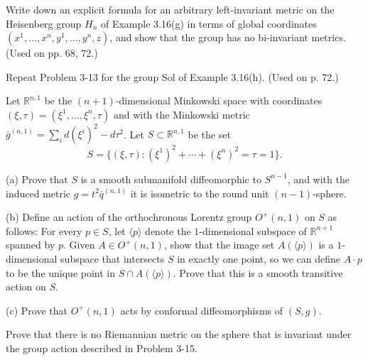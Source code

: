 \begin{exercise}
\label{prob:heisenberg-group-metrics}
Write down an explicit formula for an arbitrary left-invariant metric on the Heisenberg group $H_n$ of Example 3.16(g) in terms of global coordinates $(x^1, \ldots, x^n, y^1, \ldots, y^n, z)$, and show that the group has no bi-invariant metrics. (Used on pp. 68, 72.)
\end{exercise}

\begin{exercise}
\label{prob:sol-group-metrics}
Repeat Problem 3-13 for the group Sol of Example 3.16(h). (Used on p. 72.)
\end{exercise}

\begin{exercise}
\label{prob:minkowski-hyperboloid}
Let $\mathbb{R}^{n,1}$ be the $(n+1)$-dimensional Minkowski space with coordinates $(\xi, \tau) = (\xi^1, \ldots, \xi^n, \tau)$ and with the Minkowski metric $\bar{g}^{(n,1)} = \sum_i d(\xi^i)^2 - d\tau^2$. Let $S \subset \mathbb{R}^{n,1}$ be the set
\[
S = \{(\xi, \tau) : (\xi^1)^2 + \cdots + (\xi^n)^2 = \tau = 1\}.
\]

(a) Prove that $S$ is a smooth submanifold diffeomorphic to $S^{n-1}$, and with the induced metric $g = t^2 \bar{q}^{(n,1)}$ it is isometric to the round unit $(n-1)$-sphere.

(b) Define an action of the orthochronous Lorentz group $O^+(n,1)$ on $S$ as follows: For every $p \in S$, let $\langle p \rangle$ denote the $1$-dimensional subspace of $\mathbb{R}^{n+1}$ spanned by $p$. Given $A \in O^+(n,1)$, show that the image set $A(\langle p \rangle)$ is a $1$-dimensional subspace that intersects $S$ in exactly one point, so we can define $A \cdot p$ to be the unique point in $S \cap A(\langle p \rangle)$. Prove that this is a smooth transitive action on $S$.

(c) Prove that $O^+(n,1)$ acts by conformal diffeomorphisms of $(S,g)$.
\end{exercise}

\begin{exercise}\label{prob:no-riemannian-metric-invariant-lorentz}
Prove that there is no Riemannian metric on the sphere that is invariant under the group action described in Problem 3-15.
\end{exercise}

